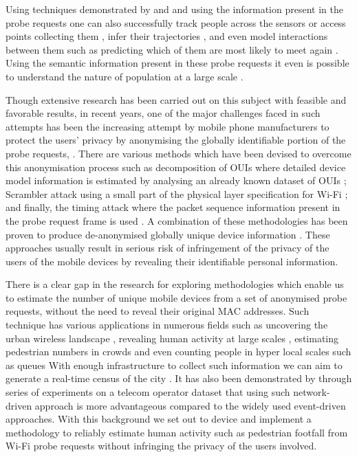 Using techniques demonstrated by \cite{franklin2006passive} and \cite{pang2007802} and using the information present in the probe requests one can also successfully track people across the sensors or access points collecting them \citep{cunche2014linking}, infer their trajectories \citep{musa2012tracking}, and even model interactions between them \citep{cheng2012inferring,barbera2013signals,cunche2014know} such as predicting which of them are most likely to meet again \citep{cunche2012know}.
Using the semantic information present in these probe requests it even is possible to understand the nature of population at a large scale \citep{di2016mind}. 

Though extensive research has been carried out on this subject with feasible and favorable results, in recent years, one of the major challenges faced in such attempts has been the increasing attempt by mobile phone manufacturers to protect the users’ privacy by anonymising the globally identifiable portion of the probe requests, \citep{green2008}.
There are various methods which have been devised to overcome this anonymisation process such as decomposition of OUIs where detailed device model information is estimated by analysing an already known dataset of OUIs \citep{martin2016decomposition}; Scrambler attack using a small part of the physical layer specification for Wi-Fi \citep{vo2016,bloessl2015scrambler}; and finally, the timing attack where the packet sequence information present in the probe request frame is used \citep{matte2016,cheng2016can}.
A combination of these methodologies has been proven to produce de-anonymised globally unique device information \citep{vanhoef2016, martin2017}.
These approaches usually result in serious risk of infringement of the privacy of the users of the mobile devices by revealing their identifiable personal information.

There is a clear gap in the research for exploring methodologies which enable us to estimate the number of unique mobile devices from a set of anonymised probe requests, without the need to reveal their original MAC addresses.
Such technique has various applications in numerous fields such as uncovering the urban wireless landscape \citep{rose2010mapping}, revealing human activity at large scales \citep{qin2013discovering}, estimating pedestrian numbers in crowds \citep{schauer2014estimating,fukuzaki2015statistical} and even counting people in hyper local scales such as queues \citep{wang2013measuring}
With enough infrastructure to collect such information we can aim to generate a real-time census of the city \citep{konto2017}.
It has also been demonstrated by \citep{pinelli2015comparing} through series of experiments on a telecom operator dataset that using such network-driven approach is more advantageous compared to the widely used event-driven approaches.
With this background we set out to device and implement a methodology to reliably estimate human activity such as pedestrian footfall from Wi-Fi probe requests without infringing the privacy of the users involved.
